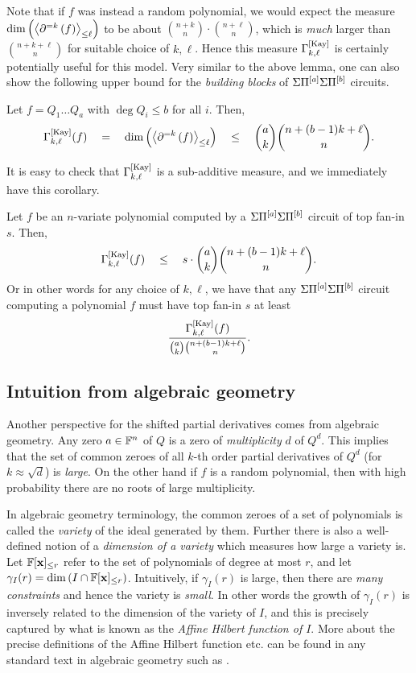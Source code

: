 Note that if $f$ was instead a random polynomial, we would expect the measure  $\dim \left(\left\langle\partial^{=k}\left(f\right)\right\rangle_{\leq \ell}\right)$ to be about $\binom{n+k}{n} \cdot \binom{n+\ell}{n}$, which is \emph{much} larger than $\binom{n+k+\ell}{n}$ for suitable choice of $k,\ell$. Hence this measure $\Gamma^{\mathrm{[Kay]}}_{k,\ell}$ is certainly potentially useful for this model. Very similar to the above lemma, one can also show the following upper bound for the \emph{building blocks} of $\Sigma\Pi^{[a]}\Sigma\Pi^{[b]}$ circuits. 

\begin{lemma}
Let $f = Q_1\dots Q_a$ with $\deg Q_i \leq b$ for all $i$. Then, 
$$
\Gamma^{\mathrm{[Kay]}}_{k,\ell}(f) \quad = \quad \dim \left(\left\langle\partial^{=k}\left(f\right)\right\rangle_{\leq \ell}\right) \quad \leq \quad \binom{a}{k}\binom{n + (b-1)k + \ell}{n}.
$$
\end{lemma}

It is easy to check that $\Gamma^{\mathrm{[Kay]}}_{k,\ell}$ is a sub-additive measure, and we immediately have this corollary. 

\begin{corollary}\label{cor:dimSPD-upper-bound}
Let $f$ be an $n$-variate polynomial computed by a $\Sigma\Pi^{[a]}\Sigma\Pi^{[b]}$ circuit of top fan-in $s$. Then,
$$
\Gamma^{\mathrm{[Kay]}}_{k,\ell}(f) \quad \leq \quad s\cdot \binom{a}{k}\binom{n + (b-1)k + \ell}{n}.
$$
Or in other words for any choice of $k,\ell$, we have that any $\Sigma\Pi^{[a]}\Sigma\Pi^{[b]}$ circuit computing a polynomial $f$ must have top fan-in $s$ at least
$$\frac{\Gamma^{\mathrm{[Kay]}}_{k,\ell}(f)}{\binom{a}{k}\binom{n+(b-1)k + \ell}{n}}.$$ 
\end{corollary}



\subsection*{Intuition from algebraic geometry}

Another perspective for the shifted partial derivatives comes from algebraic geometry. Any zero $a\in \mathbb{F}^n$ of $Q$ is a zero of \emph{multiplicity} $d$ of $Q^d$. This implies that the set of common zeroes of all $k$-th order partial derivatives of $Q^d$ (for $k \approx  \sqrt{d}$) is \emph{large}. On the other hand if $f$ is a random polynomial, then with high probability there are no roots of large multiplicity. 

In algebraic geometry terminology, the common zeroes of a set of polynomials is called the \emph{variety} of the ideal generated by them. Further there is also a well-defined notion of a \emph{dimension of a variety} which measures how large a variety is. Let $\mathbb{F}[\mathbf{x}]_{\leq r}$ refer to the set of polynomials of degree at most $r$, and let $\gamma_I(r) = \dim \left(I \cap \mathbb{F}[\mathbf{x}]_{\leq r}\right)$. Intuitively, if $\gamma_I(r)$ is large, then there are \emph{many constraints} and hence the variety is \emph{small}. In other words the growth of $\gamma_I(r)$ is inversely related to the dimension of the variety of $I$, and this is precisely captured by what is known as the \emph{Affine Hilbert function of $I$}. More about the precise definitions of the Affine Hilbert function etc. can be found in any standard text in algebraic geometry such as \cite{clo}. \\

